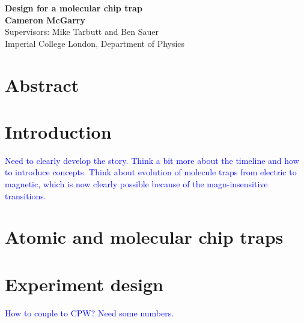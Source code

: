\documentclass[
 aps,
 a4paper,
 superscriptaddress,
 notitlepage,
 nofootinbib,
 preprint %
]{revtex4-1}
\newcommand{\cm}[1]{\textcolor{blue}{#1}} %
\begin{document}

\begin{titlepage}
  \begin{center}
    \vspace*{1cm}
      \textbf{Design for a molecular chip trap} \\
    \vspace{1.5cm}
      \textbf{Cameron McGarry} \\
    \vspace{0.5cm}
       Supervisors: Mike Tarbutt and Ben Sauer \\
    \vspace{0.5cm}
       {Imperial College London, Department of Physics} \\
  \end{center}
\end{titlepage}

\section*{Abstract}

\clearpage

\tableofcontents
\clearpage

\setcounter{page}{4} 


\section{Introduction}
\cm{Need to clearly develop the story. Think a bit more about the timeline and
how to introduce concepts. Think about evolution of molecule traps from electric
to magnetic, which is now clearly possible because of the magn-insensitive
transitions.}


\section{Atomic and molecular chip traps}
\label{litrev}


\section{Experiment design}
\label{experiment}
\cm{How to couple to CPW? Need some numbers.}

\end{document}
